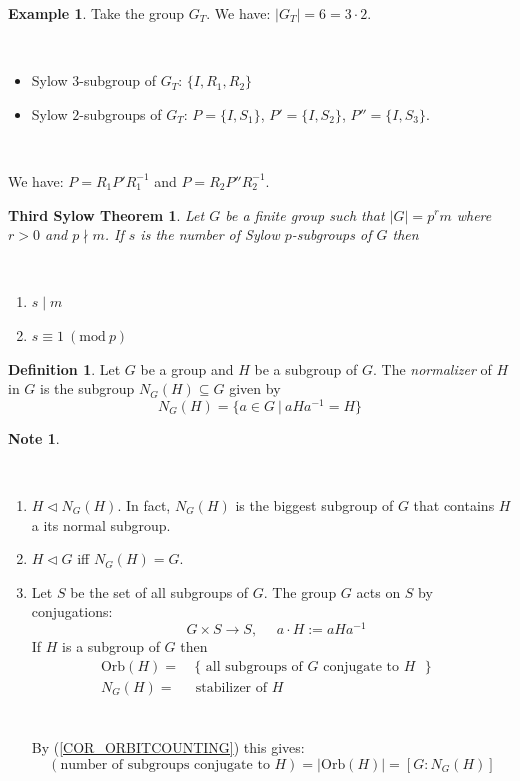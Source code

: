 \documentclass[12pt, letterpaper, oneside]{article}
\theoremstyle{plain}
\newtheorem{TST}[theorem]{Third Sylow Theorem}
\theoremstyle{definition}
\newtheorem{definition}[theorem]{Definition}
\newtheorem{example}[theorem]{Example}
\newtheorem{note}[theorem]{Note}
\newcommand{\Orb}{\mathrm{Orb}}
\newcommand{\benu}{\begin{enumerate}}
\newcommand{\eenu}{\end{enumerate}}
\newcommand{\bit}{\begin{itemize}}
\newcommand{\eit}{\end{itemize}}
\newcommand{\vs}{\vskip 5mm}
\newcommand{\isep}[1][0]{\setlength{\itemsep}{#1 mm}}
\begin{document}
\vs\vs

\begin{example}
Take the group $G_{T}$. We have: $|G_{T}| = 6 = 3\cdot 2$. 

\vskip -13mm

\ 
\bit
\isep
\item Sylow $3$-subgroup of $G_{T}$: $\{ I, R_{1}, R_{2}\}$
\item Sylow $2$-subgroups of $G_{T}$: $P = \{I, S_{1}\}$, $P' = \{I, S_{2}\}$, $P''= \{I, S_{3}\}$.
\eit
\ 

\vskip -13mm

We have: $P = R_{1}P'R_{1}^{-1}$ and  $P = R_{2}P''R_{2}^{-1}$. 
\end{example}

\vs\vs

\begin{TST}
\label{THM_TST}
Let $G$ be a finite group such that  $|G| = p^{r}m$ where $r>0$ and $p\nmid m$. If $s$ is
the number of Sylow $p$-subgroups of  $G$ then 

\vskip -13mm

\ 
\benu 
\isep
\item $s \mid m$
\item $s\equiv 1 \ (\mathrm{mod} \  p)$
\eenu
\end{TST}


\vs

\begin{definition}
Let $G$ be a group and $H$ be a subgroup of $G$. The \emph{normalizer} of 
$H$ in $G$ is the subgroup $N_{G}(H)\subseteq G$ given by 
$$N_{G}(H) = \{ a\in G \ | \  aHa^{-1} = H \}$$ 
\end{definition}


\vs\vs

\begin{note}\ 

\vskip -13mm

\ 
\benu
\item $H \lhd N_{G}(H)$. In fact, $N_{G}(H)$ is the biggest subgroup of $G$ that contains 
$H$ a its normal subgroup. 
\item $H\lhd G$ iff $N_{G}(H) = G$.
\item Let $S$ be the set of all subgroups of $G$. The group $G$ acts on $S$ by conjugations:
$$\ \ \ G\times S \to S, \ \ \ \ \ \ a\cdot H := aHa^{-1}$$ 
If $H$ is a subgroup of $G$ then 
\begin{align*}
\Orb(H) =  & \ \{ \text{ all subgroups of $G$ conjugate to $H$ }\} & \\
N_{G}(H) = & \text{ stabilizer of $H$ } & \\
\end{align*}
\ 

\vskip -12mm

By (\ref{COR_ORBITCOUNTING}) this gives:
$$
(\text{number of subgroups conjugate to $H$}) = |\Orb(H)| =   [G : N_{G}(H)]
$$

\eenu

\end{note}
\end{document}
